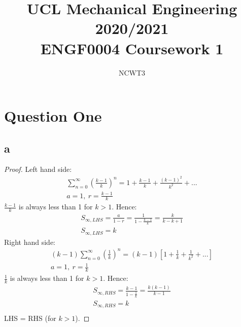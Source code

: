 \documentclass[11pt]{article}
\numberwithin{equation}{section}
\begin{document}
\title{\textbf{UCL Mechanical Engineering 2020/2021}\\ENGF0004 Coursework 1}
\author{NCWT3}
\maketitle
\section{Question One}
\subsection*{a}
\begin{proof}
Left hand side:
\begin{gather}
	\sum_{n=0}^{\infty} \left(\frac{k-1}{k}\right)^n = 1 + \frac{k-1}{k} + \frac{\left(k-1\right)^2}{k^2} + ...\\
	a= 1, \ r = \frac{k-1}{k}
\end{gather}
$\frac{k-1}{k}$ is always less than 1 for $k > 1$. Hence:
\begin{gather}
	S_{\infty, LHS} = \frac{a}{1-r} = \frac{1}{1-\frac{k-1}{k}} = \frac{k}{k-k+1}\\
	S_{\infty, LHS} = k
\end{gather}
Right hand side:
\begin{gather}
	\left(k-1\right) \sum_{n=0}^{\infty} \left(\frac{1}{k}\right)^n = \left(k-1\right) \left[1 + \frac{1}{k} + \frac{1}{k^2} + ...\right]\\
	a = 1, \ r = \frac{1}{k}
\end{gather}
$\frac{1}{k}$ is always less than 1 for $k > 1$. Hence:
\begin{gather}
	S_{\infty,RHS} = \frac{k-1}{1 - \frac{1}{k}} = \frac{k\left(k-1\right)}{k-1}\\
	S_{\infty,RHS} = k\\
\end{gather}
LHS = RHS (for $k > 1$).
\end{proof}
\end{document}
